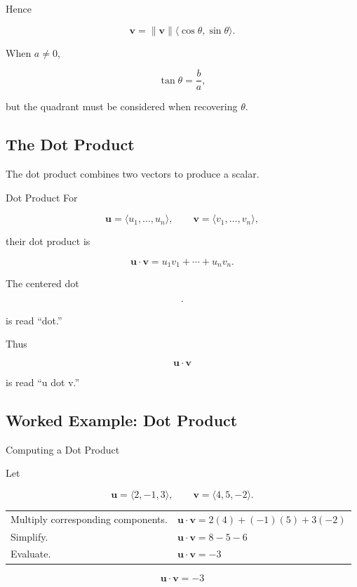 Hence

\[
\boxed{
\mathbf{v}
=
\|\mathbf{v}\|
\langle\cos\theta,\sin\theta\rangle.
}
\]

When \(a\neq0\),

\[ \tan\theta=\frac ba, \]

but the quadrant must be considered when recovering \(\theta\).

\subsection{The Dot Product}
\label{subsec:dot-product-geometry}

The dot product combines two vectors to produce a scalar.

\begin{definitionbox}{Dot Product}
For

\[
\mathbf{u}=\langle u_1,\ldots,u_n\rangle,\qquad
\mathbf{v}=\langle v_1,\ldots,v_n\rangle,
\]

their dot product is

\[ \boxed{\mathbf{u}\cdot\mathbf{v}=u_1v_1+\cdots+u_nv_n.} \]
\end{definitionbox}

The centered dot

\[ \cdot \]

is read ``dot.''

Thus

\[ \mathbf{u}\cdot\mathbf{v} \]

is read ``u dot v.''

\subsection{Worked Example: Dot Product}
\label{subsec:worked-dot-product}

\begin{workedexamplebox}{Computing a Dot Product}

Let

\[ \mathbf{u}=\langle2,-1,3\rangle,\qquad
\mathbf{v}=\langle4,5,-2\rangle. \]

\begin{tabularx}{\textwidth}{@{}>{\raggedright\arraybackslash}p{}X@{}}
Multiply corresponding components. &
\(\mathbf{u}\cdot\mathbf{v}=2(4)+(-1)(5)+3(-2)\)\\
Simplify. &
\(\mathbf{u}\cdot\mathbf{v}=8-5-6\)\\
Evaluate. &
\(\mathbf{u}\cdot\mathbf{v}=-3\)
\end{tabularx}

\begin{answerbox}
\[ \boxed{\mathbf{u}\cdot\mathbf{v}=-3} \]
\end{answerbox}
\end{workedexamplebox}

